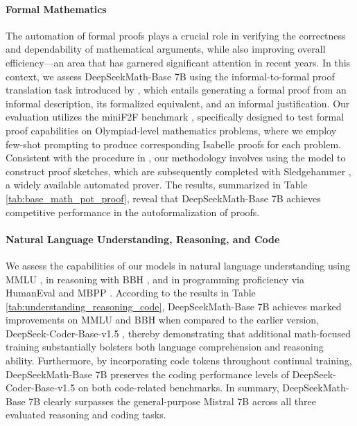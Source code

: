 \begin{itemize}[topsep=0pt]
\paragraph{Formal Mathematics}

The automation of formal proofs plays a crucial role in verifying the correctness and dependability of mathematical arguments, while also improving overall efficiency—an area that has garnered significant attention in recent years. In this context, we assess DeepSeekMath-Base 7B using the informal-to-formal proof translation task introduced by \citep{dsp_proof}, which entails generating a formal proof from an informal description, its formalized equivalent, and an informal justification. Our evaluation utilizes the miniF2F benchmark \citep{minif2f}, specifically designed to test formal proof capabilities on Olympiad-level mathematics problems, where we employ few-shot prompting to produce corresponding Isabelle proofs for each problem. Consistent with the procedure in \cite{dsp_proof}, our methodology involves using the model to construct proof sketches, which are subsequently completed with Sledgehammer \citep{sledgehammer}, a widely available automated prover. The results, summarized in Table \ref{tab:base_math_pot_proof}, reveal that DeepSeekMath-Base 7B achieves competitive performance in the autoformalization of proofs.

\paragraph{Natural Language Understanding, Reasoning, and Code}

We assess the capabilities of our models in natural language understanding using MMLU \citep{mmlu}, in reasoning with BBH \citep{bbh}, and in programming proficiency via HumanEval \citep{codex} and MBPP \citep{mbpp}. According to the results in Table \ref{tab:understanding_reasoning_code}, DeepSeekMath-Base 7B achieves marked improvements on MMLU and BBH when compared to the earlier version, DeepSeek-Coder-Base-v1.5 \citep{deepseek-coder}, thereby demonstrating that additional math-focused training substantially bolsters both language comprehension and reasoning ability. Furthermore, by incorporating code tokens throughout continual training, DeepSeekMath-Base 7B preserves the coding performance levels of DeepSeek-Coder-Base-v1.5 on both code-related benchmarks. In summary, DeepSeekMath-Base 7B clearly surpasses the general-purpose Mistral 7B \citep{mistral} across all three evaluated reasoning and coding tasks.


\end{itemize}
